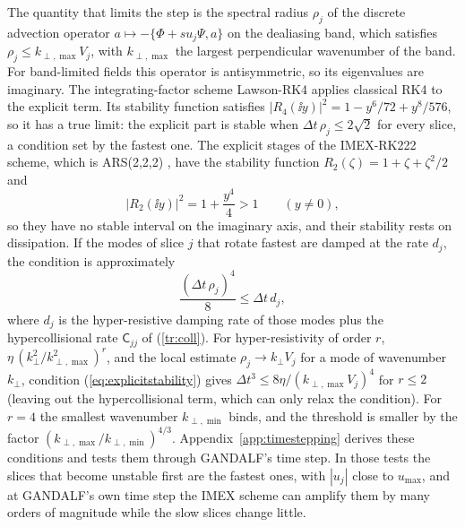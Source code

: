The quantity that limits the step is the spectral radius $\rho_j$ of the discrete advection operator $a\mapsto-\{\Phi+su_j\Psi,a\}$ on the dealiasing band, which satisfies $\rho_j\le k_{\perp,\max}V_j$, with $k_{\perp,\max}$ the largest perpendicular wavenumber of the band. For band-limited fields this operator is antisymmetric, so its eigenvalues are imaginary. The integrating-factor scheme Lawson-RK4 \citep{Lawson1967} applies classical RK4 to the explicit term. Its stability function satisfies $|R_4(\ii y)|^2=1-y^6/72+y^8/576$, so it has a true limit: the explicit part is stable when $\Delta t\,\rho_j\le2\sqrt2$ for every slice, a condition set by the fastest one. The explicit stages of the IMEX-RK222 scheme, which is ARS(2,2,2) \citep{AscherRuuthSpiteri1997}, have the stability function $R_2(\zeta)=1+\zeta+\zeta^2/2$ and
\begin{equation*}
  |R_2(\ii y)|^2=1+\frac{y^4}{4}>1\qquad(y\neq0),
\end{equation*}
so they have no stable interval on the imaginary axis, and their stability rests on dissipation. If the modes of slice $j$ that rotate fastest are damped at the rate $d_j$, the condition is approximately
\begin{equation}\label{eq:explicitstability}
  \frac{(\Delta t\,\rho_j)^4}{8}\le\Delta t\,d_j ,
\end{equation}
where $d_j$ is the hyper-resistive damping rate of those modes plus the hypercollisional rate $\mathsf C_{jj}$ of (\ref{tr:coll}). For hyper-resistivity of order $r$, $\eta\,(k_\perp^2/k_{\perp,\max}^2)^r$, and the local estimate $\rho_j\to k_\perp V_j$ for a mode of wavenumber $k_\perp$, condition (\ref{eq:explicitstability}) gives $\Delta t^3\le8\eta/(k_{\perp,\max}V_j)^4$ for $r\le2$ (leaving out the hypercollisional term, which can only relax the condition). For $r=4$ the smallest wavenumber $k_{\perp,\min}$ binds, and the threshold is smaller by the factor $(k_{\perp,\max}/k_{\perp,\min})^{4/3}$. Appendix~\ref{app:timestepping} derives these conditions and tests them through GANDALF's time step. In those tests the slices that become unstable first are the fastest ones, with $|u_j|$ close to $u_{\max}$, and at GANDALF's own time step the IMEX scheme can amplify them by many orders of magnitude while the slow slices change little.

